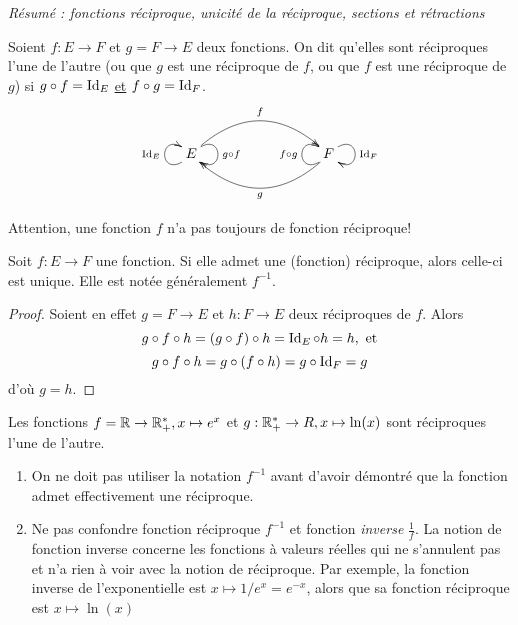 \emph{Résumé : fonctions réciproque, unicité de la réciproque, sections et rétractions}


\begin{definition}
Soient $f : E\to F$ et $g = F\to E$ deux fonctions. On dit qu'elles sont réciproques l'une de l'autre (ou que $g$ est une réciproque de $f$, ou que $f$ est une réciproque de $g$) si $g\circ f = \operatorname{Id}_E$ \underline{et} $f\circ g = \operatorname{Id}_F$. 
\[
\xymatrix{
 E \ar@(dl,ul)^{\Id_E} \ar@/^2pc/[rrr]^{f} \ar@(ur,dr)^{g\circ f} 
& & & 
\ar@/^2pc/[lll]^{g} \ar@(dl,ul)^{f\circ g} F \ar@(ur,dr)^{\Id_F}
}
\]
\end{definition}



Attention, une fonction $f$ n'a pas toujours de fonction réciproque!

\begin{proposition} Soit $f : E\to F$ une fonction. Si elle admet une (fonction) réciproque, alors celle-ci est unique. Elle est notée généralement $f^{-1}$.
\end{proposition}
\begin{proof}
Soient en effet $g = F\to E$ et $h : F \to E$ deux réciproques de $f$. Alors
\[
g\circ  f \circ h = (g\circ f) \circ h = \operatorname{Id}_E \circ h = h, \text{ et}
\]
\[
g\circ  f \circ h = g\circ (f \circ h) = g \circ \operatorname{Id}_F = g
\]
d'où $g=h$.
\end{proof}



\begin{exemple}
Les fonctions $f = \mathbb{R}\to \mathbb{R}_+^*, x\mapsto e^x$ et $g : \mathbb{R}_+^*\to R, x\mapsto \ln(x)$ sont réciproques l'une de l'autre.
\end{exemple}

\begin{attention}
\begin{enumerate}
\item On ne doit pas utiliser la notation $f^{-1}$ avant d'avoir démontré que la fonction admet effectivement une réciproque.
\item Ne pas confondre fonction réciproque $f^{-1}$ et fonction \emph{inverse} $\frac{1}{f}$. La notion de fonction inverse  concerne les fonctions à valeurs réelles qui ne s'annulent pas et n'a rien à voir avec la notion de réciproque. Par exemple, la fonction inverse de l'exponentielle est $x\mapsto 1/e^x = e^{-x}$, alors que sa fonction réciproque est $x\mapsto \ln(x)$
\end{enumerate}
\end{attention}

